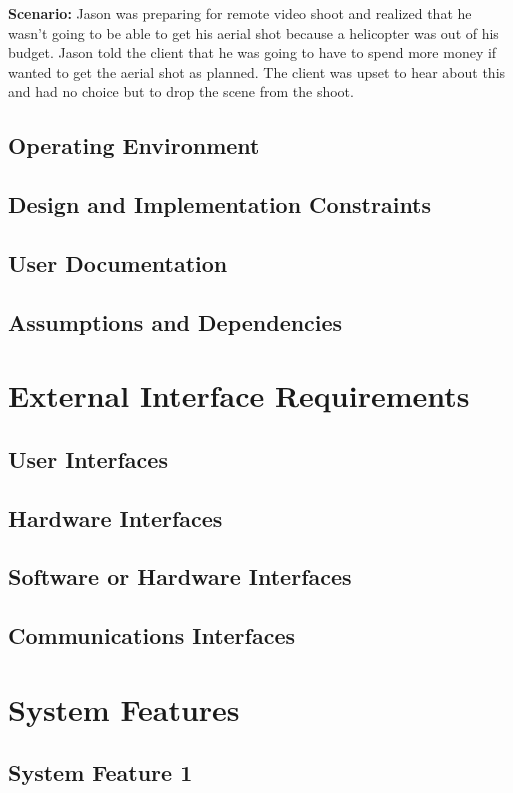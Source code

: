\documentclass[english]{article}
\numberwithin{equation}{section} %
\begin{document}
\textbf{Scenario:} Jason was preparing for remote video shoot and realized that he wasn't going to be able to get his aerial shot because a helicopter was out of his budget. Jason told the client that he was going to have to spend more money if wanted to get the aerial shot as planned. The client was upset to hear about this and had no choice but to drop the scene from the shoot. %
\subsection{Operating Environment}
\subsection{Design and Implementation Constraints}
\subsection{User Documentation}
\subsection{Assumptions and Dependencies}

\newpage
\section{External Interface Requirements}
\subsection{User Interfaces}
\subsection{Hardware Interfaces}
\subsection{Software or Hardware Interfaces}
\subsection{Communications Interfaces}

\newpage
\section{System Features}
\subsection{System Feature 1}
\end{document}

